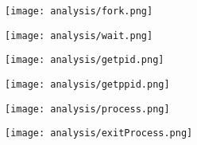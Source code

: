 \begin{multicols}{2}
\begin{center}
\texttt{[image: analysis/fork.png]} 
\end{center}
\columnbreak
\begin{center}
\texttt{[image: analysis/wait.png]} 
\end{center}
\end{multicols}

\begin{multicols}{2}
\begin{center}
\texttt{[image: analysis/getpid.png]} 
\end{center}
\columnbreak
\begin{center}
\texttt{[image: analysis/getppid.png]} 
\end{center}
\end{multicols}

\begin{multicols}{2}
\begin{center}
\texttt{[image: analysis/process.png]} 
\end{center}
\columnbreak
\begin{center}
\texttt{[image: analysis/exitProcess.png]} 
\end{center}
\end{multicols}

